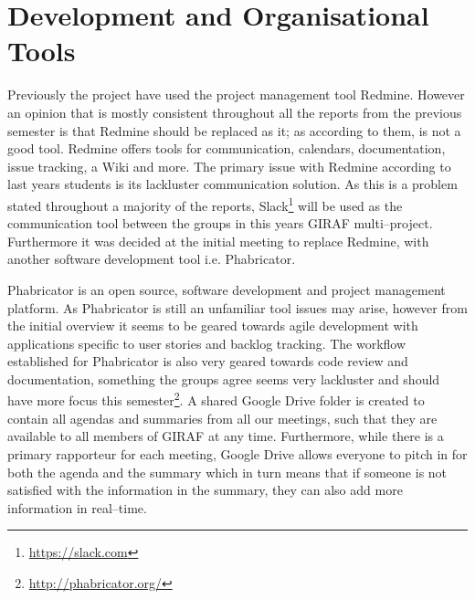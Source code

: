 \section{Development and Organisational Tools}
Previously the project have used the project management tool Redmine.
However an opinion that is mostly consistent throughout all the reports from the previous semester is that Redmine should be replaced as it;
as according to them, is not a good tool.
Redmine offers tools for communication, calendars, documentation, issue tracking, a Wiki and more.
The primary issue with Redmine according to last years students is its lackluster communication solution.
As this is a problem stated throughout a majority of the reports, Slack\footnote{\url{https://slack.com}} will be used as the communication tool between the groups in this years GIRAF multi--project.
Furthermore it was decided at the initial meeting to replace Redmine, with another software development tool i.e. Phabricator.

Phabricator is an open source, software development and project management platform.
As Phabricator is still an unfamiliar tool issues may arise, however from the initial overview it seems to be geared towards agile development with applications specific to user stories and backlog tracking.
The workflow established for Phabricator is also very geared towards code review and documentation, something the groups agree seems very lackluster and should have more focus this semester\footnote{\url{http://phabricator.org/}}.
A shared Google Drive folder is created to contain all agendas and summaries from all our meetings, such that they are available to all members of GIRAF at any time.
Furthermore, while there is a primary rapporteur for each meeting, Google Drive allows everyone to pitch in for both the agenda and the summary which in turn means that if someone is not satisfied with the information in the summary, they can also add more information in real--time.


